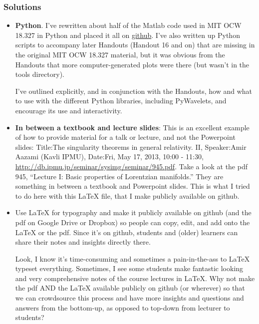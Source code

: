 \documentclass[twoside]{amsart}
\theoremstyle{plain}
\theoremstyle{definition}
\theoremstyle{remark}
\numberwithin{equation}{section}
\begin{document}
\subsubsection{Solutions}

\begin{itemize}
\item \textbf{Python}. I've rewritten about half of the Matlab code used in MIT OCW 18.327 in Python and placed it all on \href{https://github.com/ernestyalumni/18-327-wavelets-filter-banks}{github}.  I've also written up Python scripts to accompany later Handouts (Handout 16 and on) that are missing in the original MIT OCW 18.327 material, but it was obvious from the Handouts that more computer-generated plots were there (but wasn't in the tools directory).  

I've outlined explicitly, and in conjunction with the Handouts, how and what to use with the different Python libraries, including PyWavelets, and encourage its use and interactivity.      
\item \textbf{In between a textbook and lecture slides}: This is an excellent example of how to provide material for a talk or lecture, and not the Powerpoint slides: Title:The singularity theorems in general relativity. II, Speaker:Amir Aazami (Kavli IPMU), Date:Fri, May 17, 2013, 10:00 - 11:30, \url{http://db.ipmu.jp/seminar/sysimg/seminar/945.pdf}.  Take a look at the pdf 945, ``Lecture I: Basic properties of Lorentzian manifolds.''  They are something in between a textbook and Powerpoint slides.  This is what I tried to do here with this LaTeX file, that I make publicly available on github.
\item Use LaTeX for typography and make it publicly available on github (and the pdf on Google Drive or Dropbox) so people can copy, edit, and add onto the LaTeX or the pdf.  Since it's on github, students and (older) learners can share their notes and insights directly there.    

Look, I know it's time-consuming and sometimes a pain-in-the-ass to LaTeX typeset everything.  Sometimes, I see some students make fantastic looking and very comprehensive notes of the course lectures in LaTeX.  Why not make the pdf AND the LaTeX available publicly on github (or wherever) so that we can crowdsource this process and have more insights and questions and answers from the bottom-up, as opposed to top-down from lecturer to students?


\end{itemize}
\end{document}
